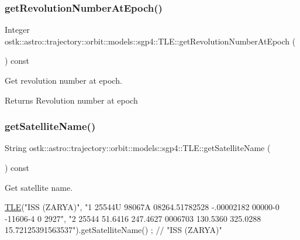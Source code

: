 \subsubsection{\texorpdfstring{get\+Revolution\+Number\+At\+Epoch()}{getRevolutionNumberAtEpoch()}}
{\footnotesize\ttfamily Integer ostk\+::astro\+::trajectory\+::orbit\+::models\+::sgp4\+::\+T\+L\+E\+::get\+Revolution\+Number\+At\+Epoch (\begin{DoxyParamCaption}{ }\end{DoxyParamCaption}) const}



Get revolution number at epoch. 

\begin{DoxyReturn}{Returns}
Revolution number at epoch 
\end{DoxyReturn}
\mbox{\label{classostk_1_1astro_1_1trajectory_1_1orbit_1_1models_1_1sgp4_1_1_t_l_e_a3cd38e40cec168239029eeec5bc57c23}} 
\subsubsection{\texorpdfstring{get\+Satellite\+Name()}{getSatelliteName()}}
{\footnotesize\ttfamily String ostk\+::astro\+::trajectory\+::orbit\+::models\+::sgp4\+::\+T\+L\+E\+::get\+Satellite\+Name (\begin{DoxyParamCaption}{ }\end{DoxyParamCaption}) const}



Get satellite name. 


\begin{DoxyCode}
\hyperlink{classostk_1_1astro_1_1trajectory_1_1orbit_1_1models_1_1sgp4_1_1_t_l_e_a57323db2c24577c2e8ddce79fa776d1e}{TLE}(\textcolor{stringliteral}{"ISS (ZARYA)"},
    \textcolor{stringliteral}{"1 25544U 98067A   08264.51782528 -.00002182  00000-0 -11606-4 0  2927"},
    \textcolor{stringliteral}{"2 25544  51.6416 247.4627 0006703 130.5360 325.0288 15.72125391563537"}).getSatelliteName() ; \textcolor{comment}{// "ISS
       (ZARYA)"}
\end{DoxyCode}


